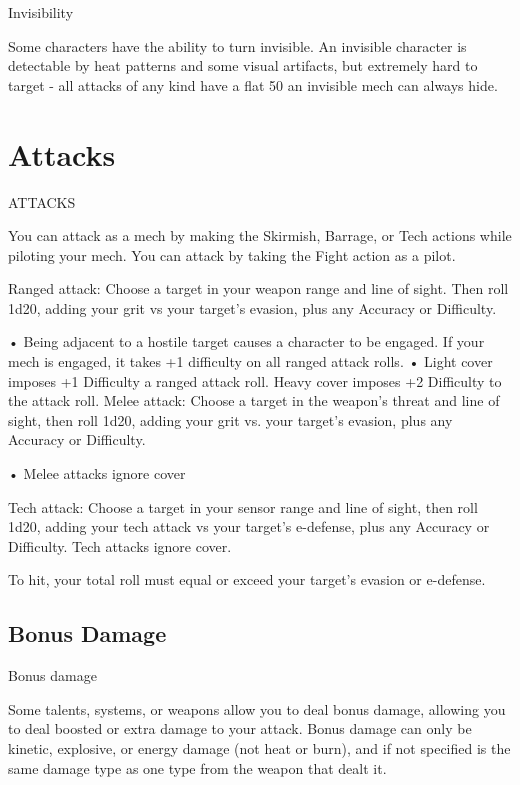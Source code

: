                                                  Invisibility

Some characters have the ability to turn invisible. An invisible character is detectable by heat
patterns and some visual artifacts, but extremely hard to target - all attacks of any kind have a
flat 50%
an invisible mech can always hide.
\section{Attacks}
                                                  ATTACKS

You can attack as a mech by making the Skirmish, Barrage, or Tech actions while piloting your
mech. You can attack by taking the Fight action as a pilot.

Ranged attack: Choose a target in your weapon range and line of sight. Then roll 1d20, adding
your grit vs your target’s evasion, plus any Accuracy or Difficulty.

                      •  Being adjacent to a hostile target causes a character to be engaged. If your
                        mech is engaged, it takes +1 difficulty on all ranged attack rolls.
                      •  Light cover imposes +1 Difficulty a ranged attack roll. Heavy cover imposes
                        +2 Difficulty to the attack roll.
Melee attack: Choose a target in the weapon’s threat and line of sight, then roll 1d20, adding
your grit vs. your target’s evasion, plus any Accuracy or Difficulty.

                      •  Melee attacks ignore cover

Tech attack: Choose a target in your sensor range and line of sight, then roll 1d20, adding your
tech attack vs your target’s e-defense, plus any Accuracy or Difficulty. Tech attacks ignore
cover.


To hit, your total roll must equal or exceed your target’s evasion or e-defense.

\subsection{Bonus Damage}
                                             Bonus damage

Some talents, systems, or weapons allow you to deal bonus damage, allowing you to deal
boosted or extra damage to your attack. Bonus damage can only be kinetic, explosive, or energy
damage (not heat or burn), and if not specified is the same damage type as one type from the
weapon that dealt it.


